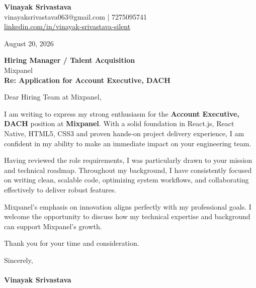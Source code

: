 \documentclass[11pt,a4paper]{article}
\begin{document}
\thispagestyle{empty}

{\Large \textbf{Vinayak Srivastava}}\\
vinayaksrivastava063@gmail.com | 7275095741 \\
\url{linkedin.com/in/vinayak-srivastava-silent}

\vspace{1em}
\hfill August 20, 2026

\textbf{Hiring Manager / Talent Acquisition}\\
Mixpanel\\

\vspace{1.5em}
\textbf{Re: Application for Account Executive, DACH}

\vspace{1em}
Dear Hiring Team at Mixpanel,

I am writing to express my strong enthusiasm for the \textbf{Account Executive, DACH} position at \textbf{Mixpanel}. With a solid foundation in React.js, React Native, HTML5, CSS3 and proven hands-on project delivery experience, I am confident in my ability to make an immediate impact on your engineering team.

Having reviewed the role requirements, I was particularly drawn to your mission and technical roadmap. Throughout my background, I have consistently focused on writing clean, scalable code, optimizing system workflows, and collaborating effectively to deliver robust features.

Mixpanel's emphasis on innovation aligns perfectly with my professional goals. I welcome the opportunity to discuss how my technical expertise and background can support Mixpanel's growth.

Thank you for your time and consideration.

\vspace{1.5em}
Sincerely,\\
\vspace{1em}\\
\textbf{Vinayak Srivastava}
\end{document}
